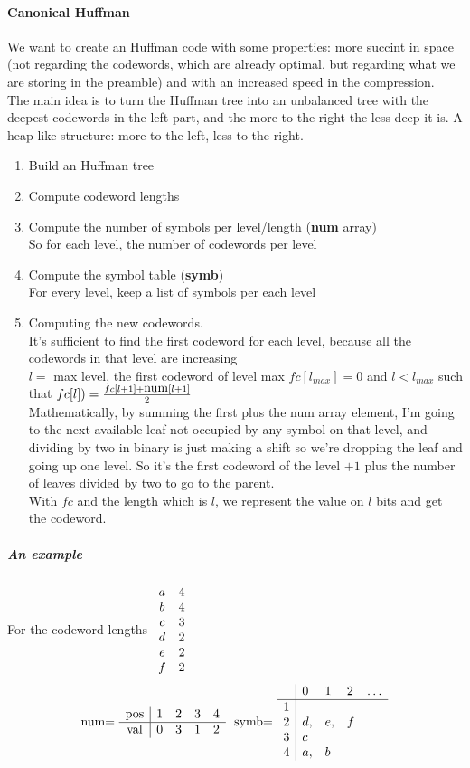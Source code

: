 \documentclass[10pt]{report}
\begin{document}
\paragraph{Canonical Huffman} We want to create an Huffman code with some properties: more succint in space (not regarding the codewords, which are already optimal, but regarding what we are storing in the preamble) and with an increased speed in the compression.\\
The main idea is to turn the Huffman tree into an unbalanced tree with the deepest codewords in the left part, and the more to the right the less deep it is. A heap-like structure: more to the left, less to the right.
\begin{enumerate}
	\item Build an Huffman tree 
	\item Compute codeword lengths
	\item Compute the number of symbols per level/length (\textbf{num} array)\\
	So for each level, the number of codewords per level
	\item Compute the symbol table (\textbf{symb})\\
	For every level, keep a list of symbols per each level
	\item Computing the new codewords.\\
	It's sufficient to find the first codeword for each level, because all the codewords in that level are increasing\\
	$l =$ max level, the first codeword of level max $fc[l_{max}] = 0$ and $l<l_{max}$ such that $fc[l])=\frac{fc[l+1]+\hbox{num}[l+1]}{2}$\\
	Mathematically, by summing the first plus the num array element, I'm going to the next available leaf not occupied by any symbol on that level, and dividing by two in binary is just making a shift so we're dropping the leaf and going up one level. So it's the first codeword of the level $+1$ plus the number of leaves divided by two to go to the parent.\\
	With $fc$ and the length which is $l$, we represent the value on $l$ bits and get the codeword.
\end{enumerate}
\subparagraph{An example} For the codeword lengths $\begin{array}{c c}
a & 4\\
b & 4\\
c & 3\\
d & 2\\
e & 2\\
f & 2
\end{array}$ $$\hbox{num= }\begin{array}{c| c c c c}
\hbox{pos}&1&2&3&4\\
\hline
\hbox{val}&0&3&1&2\\
\end{array}\:\:\:\hbox{symb= }\begin{array}{c| l l l l}
&0&1&2&\ldots\\
\hline
1&\\
2&d,&e,&f\\
3&c\\
4&a,&b
\end{array}$$
\end{document}
